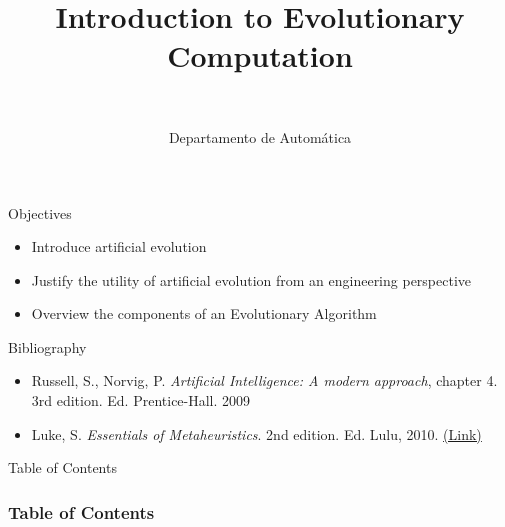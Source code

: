 \documentclass[10pt,compress]{beamer} %
\title[Introduction to Evolutionary Computation]{Introduction to Evolutionary Computation}
\author{\asignatura\\\carrera}
\institute{}
\date{Departamento de Automática}
\begin{document}
{\titlepageBlue
    \begin{frame}
        \titlepage
    \end{frame}
}

\institute{\asignatura}

\begin{frame}[plain]{}
   \begin{block}{Objectives}
       \begin{itemize}
        \item Introduce artificial evolution
		\item Justify the utility of artificial evolution from an engineering perspective
		\item Overview the components of an Evolutionary Algorithm
       \end{itemize}
   \end{block}

   \begin{block}{Bibliography}
   		\begin{itemize}
	    \item Russell, S., Norvig, P. \textit{Artificial Intelligence: A modern approach}, chapter 4. 3rd edition. Ed. Prentice-Hall. 2009
     	\item Luke, S. \emph{Essentials of Metaheuristics}. 2nd edition. Ed. Lulu, 2010. \href{https://cs.gmu.edu/~sean/book/metaheuristics/Essentials.pdf}{(Link)}
   		\end{itemize}
   \end{block}
\end{frame}

{
\begin{frame}[shrink]{Table of Contents}
 \frametitle{Table of Contents}

    \begin{multicols}{2}
    \tableofcontents
    \end{multicols}
\end{frame}
}


\end{document}
